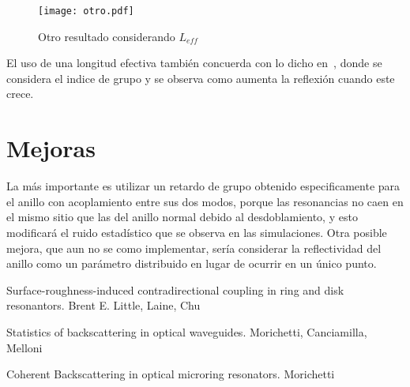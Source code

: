 \documentclass[oneside]{article}
\begin{document}
\begin{figure}[!h]
    \centering
    \texttt{[image: otro.pdf]}
    \caption{Otro resultado considerando $L_{eff}$}
    \label{r2g}
\end{figure}

El uso de una longitud efectiva también concuerda con lo dicho en~\cite{scat-anillo},
donde se considera el indice de grupo y se observa como aumenta la reflexión
cuando este crece.
\newpage
\section{Mejoras}
La más importante es utilizar un retardo de grupo obtenido especificamente
para el anillo con acoplamiento entre sus dos modos, porque las resonancias
no caen en el mismo sitio que las del anillo normal debido al desdoblamiento,
y esto modificará el ruido estadístico que se observa en las simulaciones.
Otra posible mejora, que aun no se como implementar, sería considerar la
reflectividad del anillo como un parámetro distribuido en lugar de ocurrir
en un único punto.

 \begin{thebibliography}{99}
 Surface-roughness-induced contradirectional coupling in ring and disk resonantors.
 Brent E. Little, Laine, Chu

 Statistics of backscattering in optical waveguides.
 Morichetti, Canciamilla, Melloni
 
 Coherent Backscattering in optical microring resonators.
 Morichetti
 \end{thebibliography}
\end{document}
